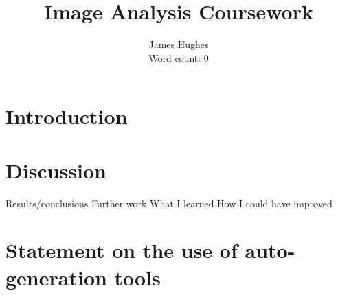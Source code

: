 \documentclass[12pt]{article}
\title{Image Analysis Coursework}
\author{James Hughes\\ Word count: 0}
\begin{document}
\maketitle

\newpage

\tableofcontents

\newpage

\section{Introduction}

\section{Discussion}
Results/conclusions
Further work
What I learned
How I could have improved \cite{keypaper}




\appendix

\section{Statement on the use of auto-generation tools}
\end{document}
